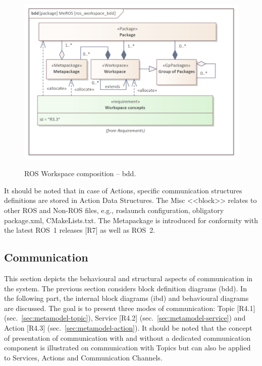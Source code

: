 \documentclass[11pt,oneside,a4paper]{article}
\begin{document}
	\begin{figure}[H]
		\centering
		\begin{center}
			{\includegraphics[scale=1.1]{img/meros_pkg/ros_workspace_bdd.png}}
		\end{center}
		\caption{ROS Workspace composition -- bdd.} 
		\label{fig:ros_workspace_bdd}
	\end{figure}
	
	It should be noted that in case of Actions, specific communication structures definitions are stored in Action Data Structures. The Misc <<block>> relates to other ROS and Non-ROS files, e.g., roslaunch configuration, obligatory package.xml, CMakeLists.txt. The Metapackage is introduced for conformity with the latest ROS~1 releases [R7] as well as ROS~2. 
		

	
	
	
\subsection{Communication}
\label{sec:metamodel-communication}
	
	This section depicts the behavioural and structural aspects of communication in the system. The previous section considers block definition diagrams (bdd). In the following part, the internal block diagrams (ibd) and behavioural diagrams are discussed. The goal is to present three modes of communication: Topic [R4.1] (sec.~\ref{sec:metamodel-topic}), Service [R4.2] (sec.~\ref{sec:metamodel-service}) and Action [R4.3] (sec.~\ref{sec:metamodel-action}). It should be noted that the concept of presentation of communication with and without a dedicated communication component is illustrated on communication with Topics but can also be applied to Services, Actions and Communication Channels.
	
\end{document}
